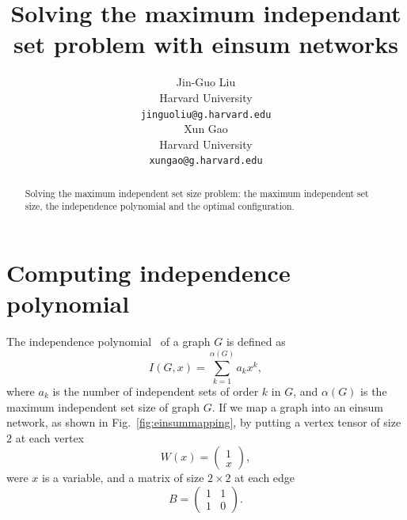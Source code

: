 \documentclass{article}
\newcommand{\<}{\langle}
\renewcommand{\>}{\rangle}
\renewcommand{\cite}[1]{{\citep{#1}}}
\newcommand{\Fig}[1]{Fig.~\ref{#1}}
\theoremstyle{definition}\newtheorem{definition}{\textit{Definition}}
\begin{document}
\title{Solving the maximum independant set problem with einsum networks}

\author{Jin-Guo Liu\\
Harvard University\\
\texttt{jinguoliu@g.harvard.edu}\\
\AND
Xun Gao\\
Harvard University\\
\texttt{xungao@g.harvard.edu}\\
}
\maketitle

\begin{abstract}
	Solving the maximum independent set size problem: the maximum independent set size, the independence polynomial and the optimal configuration.
\end{abstract}

\section{Computing independence polynomial}
The independence polynomial~\cite{Ferrin2014, Harvey2017} of a graph $G$ is defined as
\begin{equation}
I(G, x) = \sum_{k=1}^{\alpha(G)} a_k x^k,
\end{equation}
where $a_k$ is the number of independent sets of order $k$ in $G$, and $\alpha(G)$ is the maximum independent set size of graph $G$.
If we map a graph into an einsum network, as shown in \Fig{fig:einsummapping}, by putting a vertex tensor of size $2$ at each vertex
\begin{equation}
    W(x) = \left(\begin{matrix}
        1 \\
        x
    \end{matrix}\right),
\end{equation}
were $x$ is a variable, and a matrix of size $2 \times 2$ at each edge
\begin{equation}
    B = \left(\begin{matrix}
        1  & 1\\
        1 & 0
    \end{matrix}\right).
\end{equation}
\end{document}
